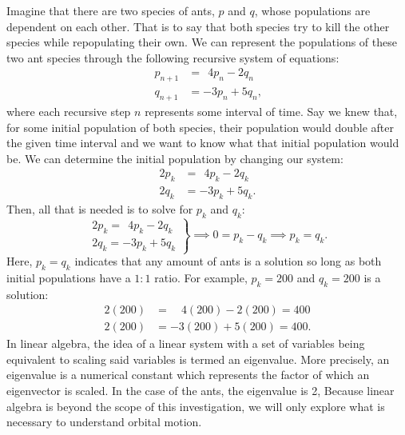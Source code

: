 Imagine that there are two species of ants, $p$ and $q$, whose populations are dependent on each other.
That is to say that both species try to kill the other species while repopulating their own.
We can represent the populations of these two ant species through the following recursive system of equations:
\begin{align*}
	p_{n+1} &=\ \ 4p_n - 2q_n \\
	q_{n+1} &= -3p_n + 5q_n \text{,}
\end{align*}
where each recursive step $n$ represents some interval of time.
Say we knew that, for some initial population of both species, their population would double after the given time interval and we want to know what that initial population would be.
We can determine the initial population by changing our system:
\begin{align*}
	2p_k &=\ \ 4p_k - 2q_k \\
	2q_k &= -3p_k + 5q_k \text{.}
\end{align*}
Then, all that is needed is to solve for $p_k$ and $q_k$:
\begin{equation*}
	\left. \begin{array}{l}
		2p_k =\ \ 4p_k - 2q_k \\
		2q_k = -3p_k + 5q_k
	\end{array} \right \} \implies
	0 = p_k - q_k \implies
	p_k = q_k \text{.}
\end{equation*}
Here, $p_k = q_k$ indicates that any amount of ants is a solution so long as both initial populations have a $1 : 1$ ratio. For example, $p_k = 200$ and $q_k = 200$ is a solution:
\begin{align*}
	2(200) &=\quad \!4(200) - 2(200) = 400 \\
	2(200) &= -3(200) + 5(200) = 400 \text{.}
\end{align*}
In linear algebra, the idea of a linear system with a set of variables being equivalent to scaling said variables is termed an eigenvalue. %
More precisely, an eigenvalue is a numerical constant which represents the factor of which an eigenvector is scaled.
In the case of the ants, the eigenvalue is 2, 
Because linear algebra is beyond the scope of this investigation, we will only explore what is necessary to understand orbital motion.

